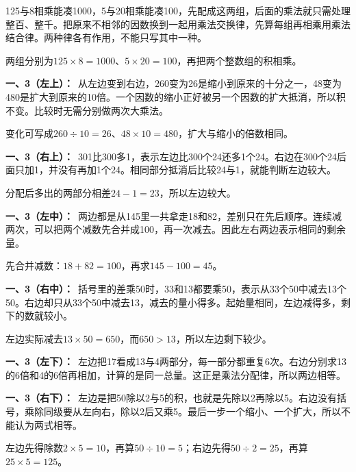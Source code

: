 \documentclass[multi=snippet,border=0pt]{standalone}
\newenvironment{snippet}[3]{\begin{minipage}{#1bp}\color{answerred}\fontsize{#2}{#3}\selectfont\raggedright}{\end{minipage}}
\begin{document}
\begin{snippet}{505}{11.5}{14}125与8相乘能凑1000，5与20相乘能凑100，先配成这两组，后面的乘法就只需处理整百、整千。把原来不相邻的因数换到一起用乘法交换律，先算每组再相乘用乘法结合律。两种律各有作用，不能只写其中一种。\par 两组分别为\(125\times8=1000\)、\(5\times20=100\)，再把两个整数组的积相乘。\end{snippet}
\begin{snippet}{505}{11.5}{14}\textbf{一、3（左上）：}\ 从左边变到右边，260变为26是缩小到原来的十分之一，48变为480是扩大到原来的10倍。一个因数的缩小正好被另一个因数的扩大抵消，所以积不变。比较时无需分别做两次大乘法。\par 变化可写成\(260\div10=26\)、\(48\times10=480\)，扩大与缩小的倍数相同。\end{snippet}
\begin{snippet}{505}{11.5}{14}\textbf{一、3（右上）：}\ 301比300多1，表示左边比300个24还多1个24。右边在300个24后面只加1，并没有再加1个24。相同部分抵消后比较24与1，就能判断左边较大。\par 分配后多出的两部分相差\(24-1=23\)，所以左边较大。\end{snippet}
\begin{snippet}{505}{11.5}{14}\textbf{一、3（左中）：}\ 两边都是从145里一共拿走18和82，差别只在先后顺序。连续减两次，可以把两个减数先合并成100，再一次减去。因此左右两边表示相同的剩余量。\par 先合并减数：\(18+82=100\)，再求\(145-100=45\)。\end{snippet}
\begin{snippet}{505}{11.5}{14}\textbf{一、3（右中）：}\ 括号里的差乘50时，33和13都要乘50，表示从33个50中减去13个50。右边却只从33个50中减去13，减去的量小得多。起始量相同，左边减得多，剩下的数就较小。\par 左边实际减去\(13\times50=650\)，而\(650>13\)，所以左边剩下较少。\end{snippet}
\begin{snippet}{505}{11.5}{14}\textbf{一、3（左下）：}\ 左边把17看成13与4两部分，每一部分都重复6次。右边分别求13的6倍和4的6倍再相加，计算的是同一总量。这正是乘法分配律，所以两边相等。\end{snippet}
\begin{snippet}{505}{11.5}{14}\textbf{一、3（右下）：}\ 左边是把50除以2与5的积，也就是先除以2再除以5。右边没有括号，乘除同级要从左向右，除以2后又乘5。最后一步一个缩小、一个扩大，所以不能认为两式相等。\par 左边先得除数\(2\times5=10\)，再算\(50\div10=5\)；右边先得\(50\div2=25\)，再算\(25\times5=125\)。\end{snippet}
\end{document}
